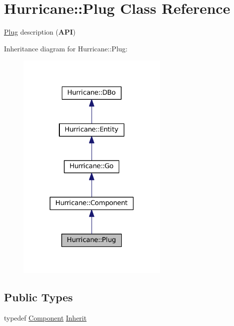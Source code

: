 \hypertarget{classHurricane_1_1Plug}{}\section{Hurricane\+:\+:Plug Class Reference}
\label{classHurricane_1_1Plug}


\mbox{\hyperlink{classHurricane_1_1Plug}{Plug}} description ({\bfseries A\+PI})  




Inheritance diagram for Hurricane\+:\+:Plug\+:\nopagebreak
\begin{figure}[H]
\begin{center}
\leavevmode
\includegraphics[width=206pt]{classHurricane_1_1Plug__inherit__graph}
\end{center}
\end{figure}
\subsection*{Public Types}
\begin{DoxyCompactItemize}
\item 
typedef \mbox{\hyperlink{classHurricane_1_1Component}{Component}} \mbox{\hyperlink{classHurricane_1_1Plug_a71bee60105cbd9fdc5f0f2e5b793eeca}{Inherit}}
\end{DoxyCompactItemize}
